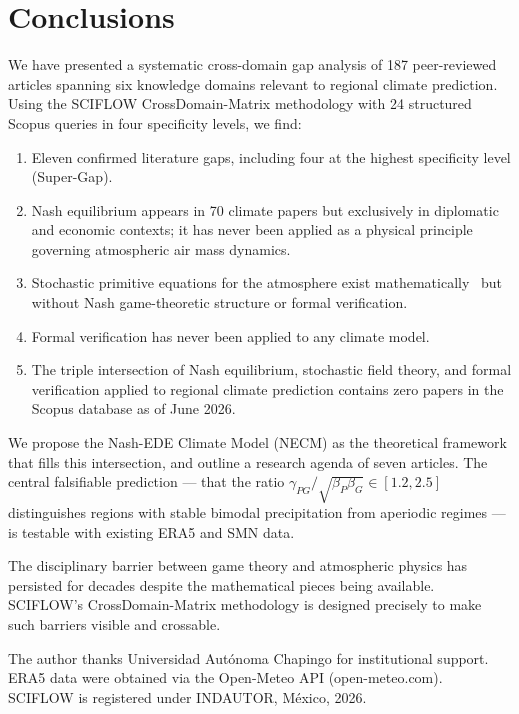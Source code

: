 \documentclass[gmd, manuscript]{copernicus}
\begin{document}
\section{Conclusions}

We have presented a systematic cross-domain gap analysis of 187
peer-reviewed articles spanning six knowledge domains relevant to
regional climate prediction. Using the SCIFLOW CrossDomain-Matrix
methodology with 24 structured Scopus queries in four specificity
levels, we find:

\begin{enumerate}
\item Eleven confirmed literature gaps, including four at the
      highest specificity level (Super-Gap).
\item Nash equilibrium appears in 70 climate papers but exclusively
      in diplomatic and economic contexts; it has never been applied
      as a physical principle governing atmospheric air mass dynamics.
\item Stochastic primitive equations for the atmosphere exist
      mathematically~\citep{Debussche2012,Majda2006} but without
      Nash game-theoretic structure or formal verification.
\item Formal verification has never been applied to any climate model.
\item The triple intersection of Nash equilibrium, stochastic field
      theory, and formal verification applied to regional climate
      prediction contains zero papers in the Scopus database as of
      June 2026.
\end{enumerate}

We propose the Nash-EDE Climate Model (NECM) as the theoretical
framework that fills this intersection, and outline a research agenda
of seven articles. The central falsifiable prediction — that the
ratio $\gamma_{PG}/\sqrt{\beta_P\beta_G} \in [1.2, 2.5]$ distinguishes
regions with stable bimodal precipitation from aperiodic regimes —
is testable with existing ERA5 and SMN data.

The disciplinary barrier between game theory and atmospheric physics
has persisted for decades despite the mathematical pieces being
available. SCIFLOW's CrossDomain-Matrix methodology is designed
precisely to make such barriers visible and crossable.



\begin{acknowledgements}
The author thanks Universidad Autónoma Chapingo for institutional support.
ERA5 data were obtained via the Open-Meteo API (open-meteo.com).
SCIFLOW is registered under INDAUTOR, México, 2026.
\end{acknowledgements}



\end{document}

